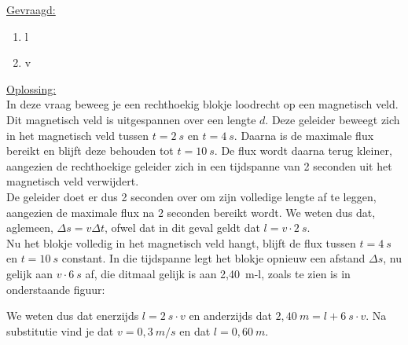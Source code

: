 \documentclass[a4paper,12pt,twoside]{article}%
\begin{document}
\underline{Gevraagd:}
\begin{enumerate}
	\item l
	\item v
\end{enumerate} 
\underline{Oplossing:}\\
In deze vraag beweeg je een rechthoekig blokje loodrecht op een magnetisch veld. Dit magnetisch veld is uitgespannen over een lengte $d$. Deze geleider beweegt zich in het magnetisch veld tussen $t=2~s$ en  $t=4~s$. Daarna is de maximale flux bereikt en blijft deze behouden tot $t= 10~s$. De flux wordt daarna terug kleiner, aangezien de rechthoekige geleider zich in een tijdspanne van 2 seconden uit het magnetisch veld verwijdert. \\
De geleider doet er dus 2 seconden over om zijn volledige lengte af te leggen, aangezien de maximale flux na 2 seconden bereikt wordt. We weten dus dat, aglemeen, $\Delta s = v\Delta t$, ofwel dat in dit geval geldt dat $l = v\cdot 2~s$.\\
Nu het blokje volledig in het magnetisch veld hangt, blijft de flux tussen $t=4~s$ en $t=10~s$ constant. In die tijdspanne legt het blokje opnieuw een afstand $\Delta s$, nu gelijk aan $v\cdot 6~s$ af, die ditmaal gelijk is aan 2,40~m-l, zoals te zien is in onderstaande figuur:
\begin{figure}[!h]
	\centering
\end{figure}
We weten dus dat enerzijds $l = 2~s\cdot v$ en anderzijds dat $2,40~m=l+6~s\cdot v$. Na substitutie vind je dat $v = 0,3~m/s$ en dat $l=0,60~m$.








 
\end{document}
